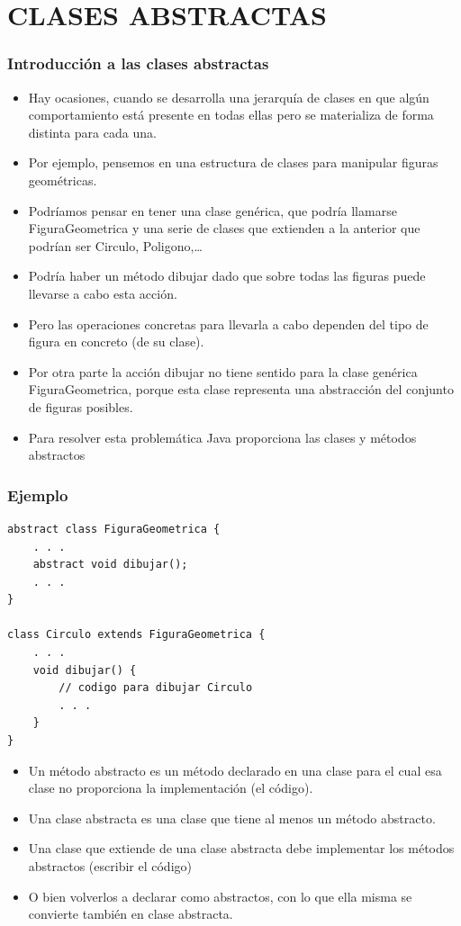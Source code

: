 \documentclass{beamer}
\begin{document}
\section{CLASES ABSTRACTAS}
\begin{frame}[fragile]
\frametitle{Introducción a las clases abstractas}
\begin{small}
\begin{itemize}[<+->]
\item Hay ocasiones, cuando se desarrolla una jerarquía de clases en que algún comportamiento está presente en todas ellas pero se materializa de forma distinta para cada una.
\item Por ejemplo, pensemos en una estructura de clases para manipular figuras geométricas.
\item Podríamos pensar en tener una clase genérica, que podría llamarse FiguraGeometrica y una serie de clases que extienden a la anterior que podrían ser Circulo, Poligono,\dots
\item Podría haber un método dibujar dado que sobre todas las figuras puede llevarse a cabo esta acción.
\item Pero las operaciones concretas para llevarla a cabo dependen del tipo de figura en concreto (de su clase).
\item Por otra parte la acción dibujar no tiene sentido para la clase genérica FiguraGeometrica, porque esta clase representa una abstracción del conjunto de figuras posibles.
\item Para resolver esta problemática Java proporciona las clases y métodos abstractos
\end{itemize}
\end{small}
\end{frame}

\begin{frame}[fragile]
\frametitle{Ejemplo}
\begin{scriptsize}
\begin{verbatim}
abstract class FiguraGeometrica {
    . . .
    abstract void dibujar();
    . . .
}

class Circulo extends FiguraGeometrica {
    . . .
    void dibujar() {
        // codigo para dibujar Circulo
        . . .
    }
} 
\end{verbatim}
\pause
\begin{itemize}[<+->]
\item  Un método abstracto es un método declarado en una clase para el cual esa clase no proporciona la implementación (el código).
\item Una clase abstracta es una clase que tiene al menos un método abstracto.
\item Una clase que extiende de una clase abstracta debe implementar los métodos abstractos (escribir el código)
\item O bien volverlos a declarar como abstractos, con lo que ella misma se convierte también en clase abstracta. 
\end{itemize}
\end{scriptsize}
\end{frame}
\end{document}
